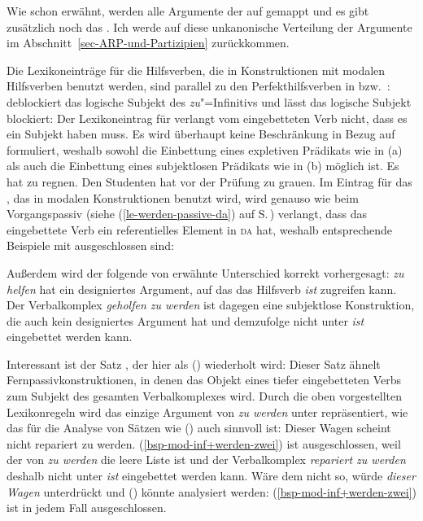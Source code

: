 {Wie schon erwähnt, werden alle Argumente der \argstl auf \comps gemappt und es gibt zusätzlich noch das
\subjm. Ich werde auf diese unkanonische Verteilung der Argumente im Abschnitt~\ref{sec-ARP-und-Partizipien} zurückkommen.

Die Lexikoneinträge für die Hilfsverben, die in Konstruktionen mit modalen Hilfsverben
benutzt werden, sind parallel zu den Perfekthilfsverben in  bzw.\ : 
\haben deblockiert das logische Subjekt des \emph{zu}"=Infinitivs und \sein lässt
das logische Subjekt blockiert: Der Lexikoneintrag für \haben verlangt vom eingebetteten
Verb nicht, dass es ein Subjekt haben muss. Es wird überhaupt keine Beschränkung in Bezug auf \subj
formuliert, weshalb sowohl die Einbettung eines expletiven Prädikats 
wie in (a) als auch die Einbettung eines subjektlosen Prädikats wie in (b) möglich ist.
\eal
\ex 
Es hat zu regnen.
\ex 
Den Studenten hat vor der Prüfung zu grauen.
\zl
\largerpage
Im Eintrag für das \sein, das in modalen Konstruktionen benutzt wird, wird genauso wie beim
Vorgangspassiv (siehe (\ref{le-werden-passive-da}) auf S.\,\pageref{le-werden-passive-da})
verlangt, dass das eingebettete Verb ein referentielles Element in \textsc{da} hat, weshalb
entsprechende Beispiele mit \sein ausgeschlossen sind:
\eal
{}
\zl

\noindent
Außerdem wird der folgende von \citet[]{Haider90b} erwähnte Unterschied 
korrekt vorhergesagt:
\eal
{}
\zl
\emph{zu helfen} hat ein designiertes Argument, auf das das Hilfsverb \emph{ist} zugreifen kann.
Der Verbalkomplex \emph{geholfen zu werden} ist dagegen eine subjektlose Konstruktion,
die auch kein designiertes Argument hat und demzufolge nicht unter \emph{ist} eingebettet
werden kann.

Interessant ist der Satz , der hier als () wiederholt wird:
\z
Dieser Satz ähnelt Fernpassivkonstruktionen, in denen das Objekt eines tiefer eingebetteten
Verbs zum Subjekt des gesamten Verbalkomplexes wird. Durch die oben vorgestellten Lexikonregeln
wird das einzige Argument von \emph{zu werden} unter \subj repräsentiert, wie das für
die Analyse von Sätzen wie () auch sinnvoll ist:
\ea
Dieser Wagen scheint nicht repariert zu werden.
\z
(\ref{bsp-mod-inf+werden-zwei}) ist ausgeschlossen, weil der \daw von \emph{zu werden} die
leere Liste ist und der Verbalkomplex \emph{repariert zu werden} deshalb nicht unter \emph{ist}
eingebettet werden kann. Wäre dem nicht so, würde \emph{dieser Wagen} unterdrückt und ()
könnte analysiert werden:
\z
(\ref{bsp-mod-inf+werden-zwei}) ist in jedem Fall ausgeschlossen.

}
